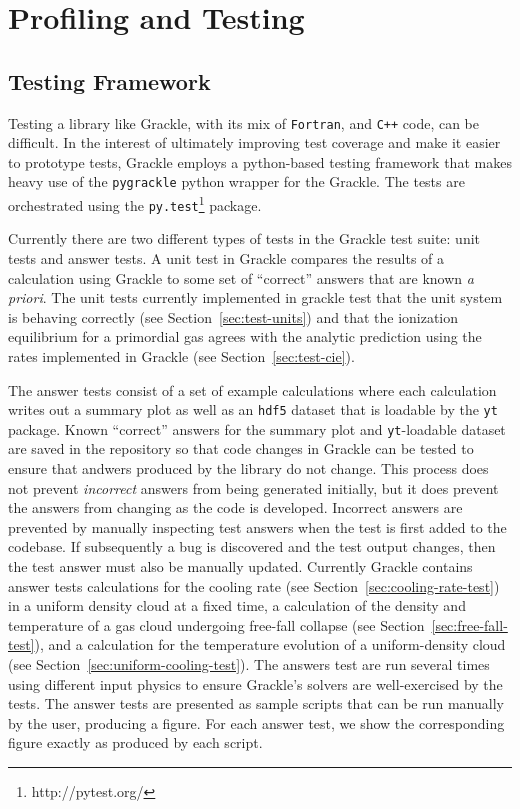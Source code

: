 \section{Profiling and Testing}
\label{sec:profiling-and-testing}



\subsection{Testing Framework}
\label{sec:testing}

Testing a library like Grackle, with its mix of \texttt{Fortran}, and
\texttt{C++} code, can be difficult. In the interest of ultimately improving
test coverage and make it easier to prototype tests, Grackle employs a
python-based testing framework that makes heavy use of the \texttt{pygrackle}
python wrapper for the Grackle. The tests are orchestrated using the
\texttt{py.test}\footnote{http://pytest.org/} package.

Currently there are two different types of tests in the Grackle test suite: unit
tests and answer tests. A unit test in Grackle compares the results of a
calculation using Grackle to some set of ``correct'' answers that are known
\textit{a priori}. The unit tests currently implemented in grackle test that the
unit system is behaving correctly (see Section~\ref{sec:test-units}) and that the
ionization equilibrium for a primordial gas agrees with the analytic prediction
using the rates implemented in Grackle (see Section~\ref{sec:test-cie}).

The answer tests consist of a set of example calculations where each calculation
writes out a summary plot as well as an \texttt{hdf5} dataset that is loadable
by the \texttt{yt} package. Known ``correct'' answers for the summary plot and
\texttt{yt}-loadable dataset are saved in the repository so that code changes in
Grackle can be tested to ensure that andwers produced by the library do not
change. This process does not prevent \textit{incorrect} answers from being
generated initially, but it does prevent the answers from changing as the code
is developed. Incorrect answers are prevented by manually inspecting test
answers when the test is first added to the codebase. If subsequently a bug is
discovered and the test output changes, then the test answer must also be
manually updated. Currently Grackle contains answer tests calculations for the
cooling rate (see Section~\ref{sec:cooling-rate-test}) in a uniform density
cloud at a fixed time, a calculation of the density and temperature of a gas
cloud undergoing free-fall collapse (see Section~\ref{sec:free-fall-test}), and
a calculation for the temperature evolution of a uniform-density cloud (see
Section~\ref{sec:uniform-cooling-test}).  The answers test are run several times
using different input physics to ensure Grackle's solvers are well-exercised by
the tests.  The answer tests are presented as sample scripts that can
be run manually by the user, producing a figure.  For each answer
test, we show the corresponding figure exactly as produced by each
script.

